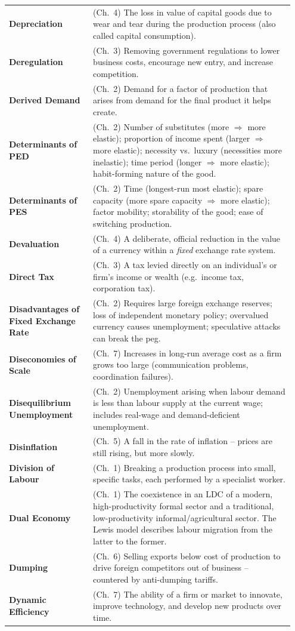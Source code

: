 \documentclass[11pt, a4paper, twoside]{book}
\begin{document}
\begin{longtable}{@{}>{\RaggedRight\arraybackslash}p{0.28\linewidth}>{\RaggedRight\arraybackslash}p{0.67\linewidth}@{}}
\textbf{Depreciation} & (Ch.~4) The loss in value of capital goods due to wear and tear during the production process (also called capital consumption). \\
\textbf{Deregulation} & (Ch.~3) Removing government regulations to lower business costs, encourage new entry, and increase competition. \\
\textbf{Derived Demand} & (Ch.~2) Demand for a factor of production that arises from demand for the final product it helps create. \\
\textbf{Determinants of PED} & (Ch.~2) Number of substitutes (more $\Rightarrow$ more elastic); proportion of income spent (larger $\Rightarrow$ more elastic); necessity vs.\ luxury (necessities more inelastic); time period (longer $\Rightarrow$ more elastic); habit-forming nature of the good. \\
\textbf{Determinants of PES} & (Ch.~2) Time (longest-run most elastic); spare capacity (more spare capacity $\Rightarrow$ more elastic); factor mobility; storability of the good; ease of switching production. \\
\textbf{Devaluation} & (Ch.~4) A deliberate, official reduction in the value of a currency within a \emph{fixed} exchange rate system. \\
\textbf{Direct Tax} & (Ch.~3) A tax levied directly on an individual's or firm's income or wealth (e.g.\ income tax, corporation tax). \\
\textbf{Disadvantages of Fixed Exchange Rate} & (Ch.~2) Requires large foreign exchange reserves; loss of independent monetary policy; overvalued currency causes unemployment; speculative attacks can break the peg. \\
\textbf{Diseconomies of Scale} & (Ch.~7) Increases in long-run average cost as a firm grows too large (communication problems, coordination failures). \\
\textbf{Disequilibrium Unemployment} & (Ch.~2) Unemployment arising when labour demand is less than labour supply at the current wage; includes real-wage and demand-deficient unemployment. \\
\textbf{Disinflation} & (Ch.~5) A fall in the rate of inflation -- prices are still rising, but more slowly. \\
\textbf{Division of Labour} & (Ch.~1) Breaking a production process into small, specific tasks, each performed by a specialist worker. \\
\textbf{Dual Economy} & (Ch.~1) The coexistence in an LDC of a modern, high-productivity formal sector and a traditional, low-productivity informal/agricultural sector. The Lewis model describes labour migration from the latter to the former. \\
\textbf{Dumping} & (Ch.~6) Selling exports below cost of production to drive foreign competitors out of business -- countered by anti-dumping tariffs. \\
\textbf{Dynamic Efficiency} & (Ch.~7) The ability of a firm or market to innovate, improve technology, and develop new products over time. \\


\end{longtable}
\end{document}

